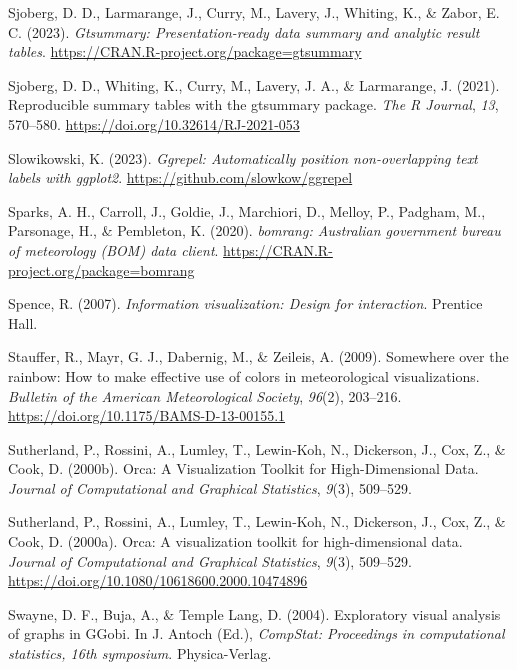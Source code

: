 \documentclass[
  letterpaper,
]{book}
\newlength{\cslhangindent}
\newlength{\cslentryspacingunit} %
\newenvironment{CSLReferences}[2] %
 {%
  \setlength{\parindent}{0pt}
  \ifodd #1
  \let\oldpar\par
  \def\par{\hangindent=\cslhangindent\oldpar}
  \fi
  \setlength{\parskip}{#2\cslentryspacingunit}
 }%
 {}
\begin{document}
\begin{CSLReferences}{1}{0}
\leavevmode{}%
Sjoberg, D. D., Larmarange, J., Curry, M., Lavery, J., Whiting, K., \&
Zabor, E. C. (2023). \emph{Gtsummary: Presentation-ready data summary
and analytic result tables}.
\url{https://CRAN.R-project.org/package=gtsummary}

\leavevmode{}%
Sjoberg, D. D., Whiting, K., Curry, M., Lavery, J. A., \& Larmarange, J.
(2021). Reproducible summary tables with the gtsummary package.
\emph{{The R Journal}}, \emph{13}, 570--580.
\url{https://doi.org/10.32614/RJ-2021-053}

\leavevmode{}%
Slowikowski, K. (2023). \emph{Ggrepel: Automatically position
non-overlapping text labels with ggplot2}.
\url{https://github.com/slowkow/ggrepel}

\leavevmode{}%
Sparks, A. H., Carroll, J., Goldie, J., Marchiori, D., Melloy, P.,
Padgham, M., Parsonage, H., \& Pembleton, K. (2020). \emph{{bomrang}:
Australian government bureau of meteorology (BOM) data client}.
\url{https://CRAN.R-project.org/package=bomrang}

\leavevmode{}%
Spence, R. (2007). \emph{Information visualization: Design for
interaction}. Prentice Hall.

\leavevmode{}%
Stauffer, R., Mayr, G. J., Dabernig, M., \& Zeileis, A. (2009).
Somewhere over the rainbow: How to make effective use of colors in
meteorological visualizations. \emph{Bulletin of the American
Meteorological Society}, \emph{96}(2), 203--216.
\url{https://doi.org/10.1175/BAMS-D-13-00155.1}

\leavevmode{}%
Sutherland, P., Rossini, A., Lumley, T., Lewin-Koh, N., Dickerson, J.,
Cox, Z., \& Cook, D. (2000b). Orca: {A} {V}isualization {T}oolkit for
{H}igh-{D}imensional {D}ata. \emph{Journal of Computational and
Graphical Statistics}, \emph{9}(3), 509--529.

\leavevmode{}%
Sutherland, P., Rossini, A., Lumley, T., Lewin-Koh, N., Dickerson, J.,
Cox, Z., \& Cook, D. (2000a). Orca: A visualization toolkit for
high-dimensional data. \emph{Journal of Computational and Graphical
Statistics}, \emph{9}(3), 509--529.
\url{https://doi.org/10.1080/10618600.2000.10474896}

\leavevmode{}%
Swayne, D. F., Buja, A., \& Temple Lang, D. (2004). Exploratory visual
analysis of graphs in {GG}obi. In J. Antoch (Ed.), \emph{CompStat:
Proceedings in computational statistics, 16th symposium}.
Physica-Verlag.


\end{CSLReferences}
\end{document}
